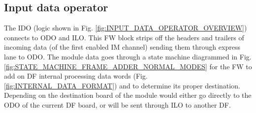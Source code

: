 \documentclass[11pt,letterpaper]{article}
\begin{document}
\subsection{Input data operator}

The IDO (logic shown in Fig. \ref{fig:INPUT_DATA_OPERATOR_OVERVIEW}) connects to ODO and ILO. This FW block strips off the headers and trailers of incoming data (of the first enabled IM channel) sending them through express lane to ODO. The module data goes through a state machine diagrammed in Fig. \ref{fig:STATE_MACHINE_FRAME_ADDER_NORMAL_MODES} for the FW to add on DF internal processing data words (Fig. \ref{fig:INTERNAL_DATA_FORMAT}) and to determine its proper destination. Depending on the destination board of the module would either go directly to the ODO of the current DF board, or will be sent through ILO to another DF. 
\end{document}
